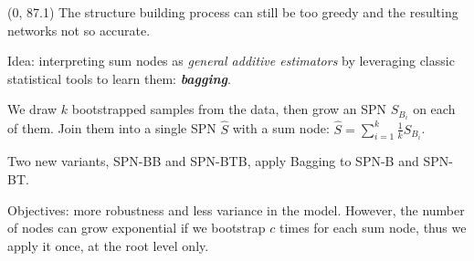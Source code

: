 \documentclass[final]{beamer}
\begin{document}
\begin{frame}{}
  \begin{textblock}{25.2}(0, 87.1)
    \footnotesize
    The structure building process can still be too greedy and the
    resulting networks not so accurate.\par\bigskip
    
    Idea: interpreting sum nodes as \emph{general additive estimators}
    by leveraging
    classic statistical tools to learn them:
    \textbf{\emph{bagging}}.\par\bigskip

    We draw $k$ bootstrapped samples from the data, then grow an SPN $S_{B_i}$ on
    each of them. Join them into a single SPN $\hat{S}$ with a sum node:
    $\hat{S}=\sum_{i=1}^{k}\frac{1}{k}S_{B_{i}}$.\par\bigskip
    
    Two new variants, \textsf{SPN-BB} and
    \textsf{SPN-BTB}, apply \textsf{B}agging to \textsf{SPN-B} and \textsf{SPN-BT}.\par\bigskip

    Objectives: more robustness and less variance in the model.
    However, the number of nodes can grow exponential if we bootstrap
    $c$ times for each sum node, thus we
    apply it once, at the root level only.

    

  \end{textblock}
  

\end{frame}
\end{document}
